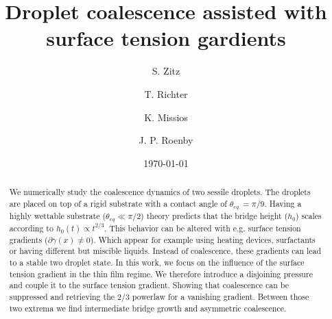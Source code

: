 \documentclass[twocolumn,amsmath,amssymb,showpacs,pre,nofootinbib,superscriptaddress]{revtex4-1} %
\begin{document}

\title{Droplet coalescence assisted with surface tension gardients}

\author{S. Zitz}
 \author{T. Richter}%
 \author{K. Missios}%
 \author{J. P. Roenby}%
\date{\today}

\begin{abstract}
We numerically study the coalescence dynamics of two sessile droplets.
The droplets are placed on top of a rigid substrate with a contact angle of $\theta_{eq.} = \pi/9$. 
Having a highly wettable substrate ($\theta_{eq} \ll \pi/2$) theory predicts that the bridge height ($h_0$) scales according to $h_0(t) \propto t^{2/3}.$
This behavior can be altered with e.g. surface tension gradients ($\partial\gamma(x) \neq 0$). 
Which appear for example using heating devices, surfactants or having different but miscible liquids.
Instead of coalescence, these gradients can lead to a stable two droplet state. 
In this work, we focus on the influence of the surface tension gradient in the thin film regime. 
We therefore introduce a disjoining pressure and couple it to the surface tension gradient.
Showing that coalescence can be suppressed and retrieving the $2/3$ powerlaw for a vanishing gradient.
Between those two extrema we find intermediate bridge growth and asymmetric coalescence.
\end{abstract}
\end{document}
